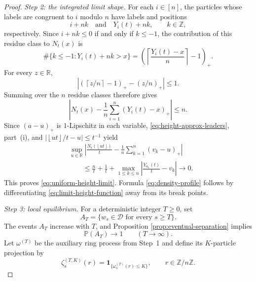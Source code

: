 \documentclass[11pt,a4paper]{amsart}
\theoremstyle{definition}
\theoremstyle{remark}
\numberwithin{equation}{section}
\newcommand{\Z}{\mathbb Z}
\newcommand{\R}{\mathbb R}
\newcommand{\Pp}{\mathbb P}
\newcommand{\one}{\mathbf 1}
\newcommand{\cD}{\mathcal D}
\newcommand{\floor}[1]{\left\lfloor #1\right\rfloor}
\newcommand{\ceil}[1]{\left\lceil #1\right\rceil}
\newcommand{\abs}[1]{\left|#1\right|}
\newcommand{\pospart}[1]{\left(#1\right)_{+}}
\begin{document}
\begin{proof}
		\medskip
		\noindent\emph{Step 2: the integrated limit shape.}
		For each $i\in[n]$, the particles whose labels are congruent to $i$ modulo
		$n$ have labels and positions
		\begin{equation}\label{eq:class-particles}
			i+nk
			\quad\text{and}\quad
			Y_i(t)+nk,
			\qquad k\in\Z,
		\end{equation}
		respectively.  Since $i+nk\le0$ if and only if $k\le-1$, the contribution of
		this residue class to $N_t(x)$ is
		\begin{equation}\label{eq:class-count-exact}
			\#\{k\le-1:Y_i(t)+nk>x\}
			=\pospart{\ceil{\frac{Y_i(t)-x}{n}}-1}.
		\end{equation}
		For every $z\in\R$,
		\[
		\abs{\pospart{\ceil{z/n}-1}-\pospart{z/n}}\le1.
		\]
		Summing over the $n$ residue classes therefore gives
		\begin{equation}\label{eq:height-approx-leaders}
			\abs{N_t(x)-\frac1n\sum_{i=1}^n\pospart{Y_i(t)-x}}
			\le n.
		\end{equation}
		Since $(a-u)_+$ is $1$-Lipschitz in each variable,
		\eqref{eq:height-approx-leaders}, part~(i), and
		$\abs{\floor{ut}/t-u}\le t^{-1}$ yield
		\begin{align*}
			&\sup_{u\in\R}
			\abs{\frac{N_t(\floor{ut})}{t}
				-\frac1n\sum_{k=1}^n\pospart{v_k-u}}\\
			&\qquad\le \frac nt+\frac1t
			+\max_{1\le k\le n}
			\abs{\frac{Y_{a_k}(t)}t-v_k}
			\longrightarrow0.
		\end{align*}
		This proves \eqref{eq:uniform-height-limit}.  Formula
		\eqref{eq:density-profile} follows by differentiating
		\eqref{eq:limit-height-function} away from its break points.
		
		\medskip
		\noindent\emph{Step 3: local equilibrium.}
		For a deterministic integer $T\ge0$, set
		\begin{equation}\label{eq:AT-definition}
			A_T=\{w_s\in\cD\text{ for every }s\ge T\}.
		\end{equation}
		The events $A_T$ increase with $T$, and Proposition
		\ref{prop:eventual-separation} implies
		\begin{equation}\label{eq:AT-probability}
			\Pp(A_T)\longrightarrow1
			\qquad(T\to\infty).
		\end{equation}
		Let $\omega^{(T)}$ be the auxiliary ring process from Step~1 and define its
		$K$-particle projection by
		\begin{equation}\label{eq:ring-K-projection}
			\zeta_s^{(T,K)}(r)
			=\one_{\{\omega_s^{(T)}(r)\le K\}},
			\qquad r\in\Z/n\Z.
		\end{equation}
		

\end{proof}
\end{document}
